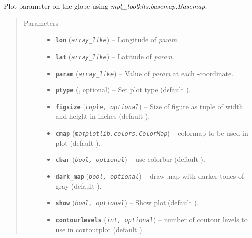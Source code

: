 \documentclass[letterpaper,10pt,english]{sphinxhowto}
\begin{document}
\begin{fulllineitems}
\label{swtools_doc:swtools.plot_geo}
Plot parameter on the globe using \emph{mpl\_toolkits.basemap.Basemap}.
\begin{quote}\begin{description}
\item[{Parameters}] \leavevmode\begin{itemize}
\item {} 
\textbf{\texttt{lon}} (\emph{\texttt{array\_like}}) -- Longitude of \emph{param}.

\item {} 
\textbf{\texttt{lat}} (\emph{\texttt{array\_like}}) -- Latitude of \emph{param}.

\item {} 
\textbf{\texttt{param}} (\emph{\texttt{array\_like}}) -- Value of \emph{param} at each -coordinate.

\item {} 
\textbf{\texttt{ptype}} (, optional) -- Set plot type (default ).

\item {} 
\textbf{\texttt{figsize}} (\emph{\texttt{tuple, optional}}) -- Size of figure as tuple of width and height in inches
(default ).

\item {} 
\textbf{\texttt{cmap}} (\emph{\texttt{matplotlib.colors.ColorMap}}) -- colormap to be used in plot
(default ).

\item {} 
\textbf{\texttt{cbar}} (\emph{\texttt{bool, optional}}) -- use colorbar (default ).

\item {} 
\textbf{\texttt{dark\_map}} (\emph{\texttt{bool, optional}}) -- draw map with darker tones of gray (default ).

\item {} 
\textbf{\texttt{show}} (\emph{\texttt{bool, optional}}) -- Show plot (default ).

\item {} 
\textbf{\texttt{contourlevels}} (\emph{\texttt{int, optional}}) -- number of coutour levels to use in coutourplot (default ).


\end{itemize}
\end{description}
\end{quote}
\end{fulllineitems}
\end{document}
